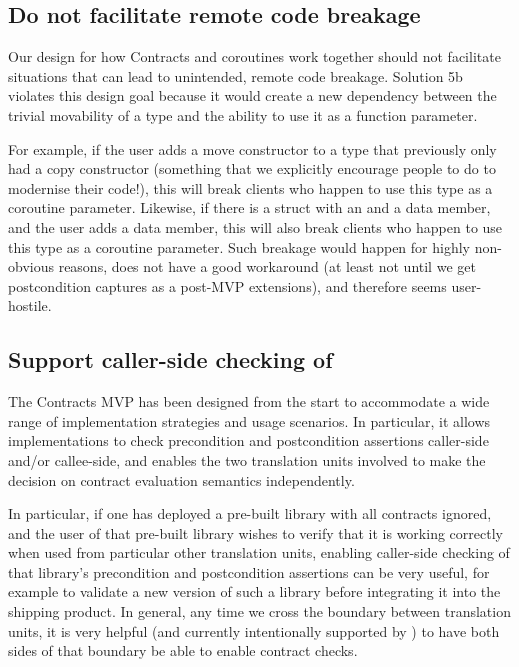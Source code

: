 \subsection{Do not facilitate remote code breakage}

Our design for how Contracts and coroutines work together should not facilitate situations that can lead to unintended, remote code breakage. Solution 5b violates this design goal because it would create a new dependency between the trivial movability of a type and the ability to use it as a function parameter.

For example, if the user adds a move constructor to a type that previously only had a copy constructor (something that we explicitly encourage people to do to modernise their code!), this will break clients who happen to use this type as a coroutine parameter. Likewise, if there is a struct with an  and a  data member, and the user adds a  data member, this will also break clients who happen to use this type as a coroutine parameter. Such breakage would happen for highly non-obvious reasons, does not have a good workaround (at least not until we get postcondition captures as a post-MVP extensions), and therefore seems user-hostile.

\subsection{Support caller-side checking of }

The Contracts MVP has been designed from the start to accommodate a wide range of implementation strategies and usage scenarios. In particular, it allows implementations to check precondition and postcondition assertions caller-side and/or callee-side, and enables the two translation units involved to make the decision on contract evaluation semantics independently.

In particular, if one has deployed a pre-built library with all contracts ignored, and the user of that pre-built library wishes to verify that it is working correctly when used from particular other translation units, enabling caller-side checking of that library's precondition and postcondition assertions can be very useful, for example to validate a new version of such a library before integrating it into the shipping product. In general, any time we cross the boundary between translation units, it is very helpful (and currently intentionally supported by \cite{P2900R8}) to have both sides of that boundary be able to enable contract checks.

